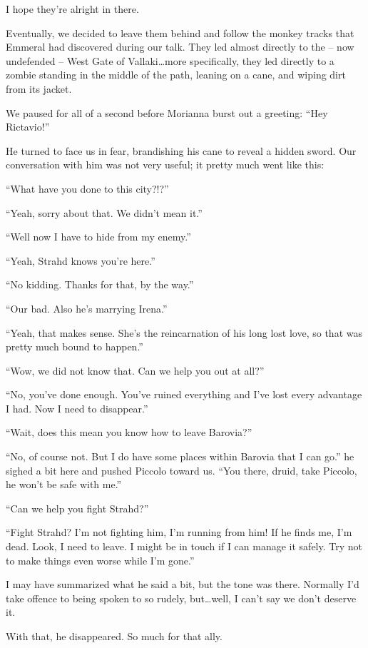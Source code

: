 I hope they're alright in there.

Eventually, we decided to leave them behind and follow the monkey tracks that Emmeral had discovered during our talk. They led almost directly to the -- now undefended -- West Gate of Vallaki\dots more specifically, they led directly to a zombie standing in the middle of the path, leaning on a cane, and wiping dirt from its jacket.

We paused for all of a second before Morianna burst out a greeting: ``Hey Rictavio!''

He turned to face us in fear, brandishing his cane to reveal a hidden sword. Our conversation with him was not very useful; it pretty much went like this:

``What have you done to this city?!?''

``Yeah, sorry about that. We didn't mean it.''

``Well now I have to hide from my enemy.''

``Yeah, Strahd knows you're here.''

``No kidding. Thanks for that, by the way.''

``Our bad. Also he's marrying Irena.''

``Yeah, that makes sense. She's the reincarnation of his long lost love, so that was pretty much bound to happen.''

``Wow, we did not know that. Can we help you out at all?''

``No, you've done enough. You've ruined everything and I've lost every advantage I had. Now I need to disappear.''

``Wait, does this mean you know how to leave Barovia?''

``No, of course not. But I do have some places within Barovia that I can go.'' he sighed a bit here and pushed Piccolo toward us. ``You there, druid, take Piccolo, he won't be safe with me.''

``Can we help you fight Strahd?''

``Fight Strahd? I'm not fighting him, I'm running from him! If he finds me, I'm dead. Look, I need to leave. I might be in touch if I can manage it safely. Try not to make things even worse while I'm gone.''

I may have summarized what he said a bit, but the tone was there. Normally I'd take offence to being spoken to so rudely, but\dots well, I can't say we don't deserve it.

With that, he disappeared. So much for that ally.

